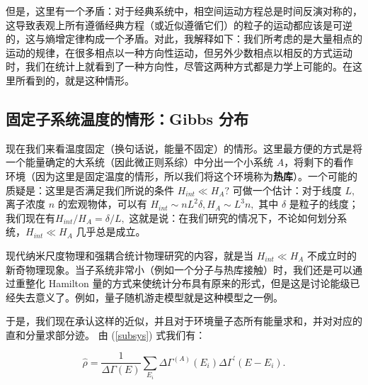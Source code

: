 但是，这里有一个矛盾：对于经典系统中，相空间运动方程总是时间反演对称的，这导致表观上所有遵循经典方程（或近似遵循它们）的粒子的运动都应该是可逆的，这与熵增定律构成一个矛盾。对此，我解释如下：我们所考虑的是大量相点的运动的规律，在很多相点以一种方向性运动，但另外少数相点以相反的方式运动时，我们在统计上就看到了一种方向性，尽管这两种方式都是力学上可能的。在这里所看到的，就是这种情形。
\subsection{固定子系统温度的情形：Gibbs 分布}
现在我们来看温度固定（换句话说，能量不固定）的情形。这里最方便的方式是将一个能量确定的大系统（因此微正则系综）中分出一个小系统 $A$，将剩下的看作环境（因为这里是固定温度的情形，所以我们将这个环境称为\textbf{热库}）。一个可能的质疑是：这里是否满足我们所说的条件 $H_{int} \ll H_A?$ 可做一个估计：对于线度 $L,$ 离子浓度 $n$ 的宏观物体，可以有 $H_{int} \sim n L^2 \delta, H_A \sim L^3 n,$ 其中 $\delta$ 是粒子的线度；我们现在有$H_{int}/H_A=\delta/L,$ 这就是说：在我们研究的情况下，不论如何划分系统，$H_{int} \ll H_A$ 几乎总是成立。

\begin{remark}
  现代纳米尺度物理和强耦合统计物理研究的内容，就是当 $H_{int} \ll H_A$ 不成立时的新奇物理现象。当子系统非常小（例如一个分子与热库接触）时，我们还是可以通过重整化 Hamilton 量的方式来使统计分布具有原来的形式，但是这是讨论能级已经失去意义了。例如，量子随机游走模型就是这种模型之一例。
\end{remark}

于是，我们现在承认这样的近似，并且对于环境量子态所有能量求和，并对对应的直和分量求部分迹。
由 (\ref{subsys}) 式我们有：
\begin{linenomath}\begin{equation}
  \hat\rho = \frac{1}{\Delta\Gamma\left( E \right)}\sum_{E_i} \Delta\Gamma^{\left( A \right)}(E_i)\Delta\Gamma^{\prime}(E-E_i) .
\end{equation}\end{linenomath}

